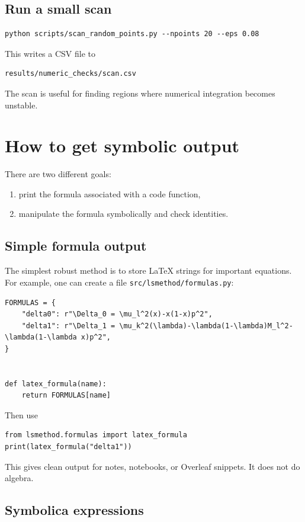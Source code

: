 \documentclass[11pt,a4paper]{article}
\begin{document}
\subsection{Run a small scan}

\begin{lstlisting}
python scripts/scan_random_points.py --npoints 20 --eps 0.08
\end{lstlisting}
This writes a CSV file to
\begin{lstlisting}
results/numeric_checks/scan.csv
\end{lstlisting}
The scan is useful for finding regions where numerical integration becomes unstable.

\section{How to get symbolic output}

There are two different goals:
\begin{enumerate}
  \item print the formula associated with a code function,
  \item manipulate the formula symbolically and check identities.
\end{enumerate}

\subsection{Simple formula output}

The simplest robust method is to store LaTeX strings for important equations. For example, one can create a file \texttt{src/lsmethod/formulas.py}:

\begin{lstlisting}
FORMULAS = {
    "delta0": r"\Delta_0 = \mu_l^2(x)-x(1-x)p^2",
    "delta1": r"\Delta_1 = \mu_k^2(\lambda)-\lambda(1-\lambda)M_l^2-\lambda(1-\lambda x)p^2",
}


def latex_formula(name):
    return FORMULAS[name]
\end{lstlisting}

Then use
\begin{lstlisting}
from lsmethod.formulas import latex_formula
print(latex_formula("delta1"))
\end{lstlisting}
This gives clean output for notes, notebooks, or Overleaf snippets. It does not do algebra.

\subsection{Symbolica expressions}
\end{document}
